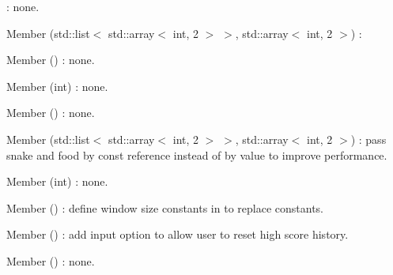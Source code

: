 \begin{DoxyRefList}
%
\+: none.  
\item[Member \doxylink{classbocan_1_1snake_1_1_printer_a250cffd120e0e4ecfd742067be2a8115}{bocan\+::snake\+::Printer\+::Print\+Game\+Space} (std\+::list\texorpdfstring{$<$}{<} std\+::array$<$ int, 2 $>$ \texorpdfstring{$>$}{>}, std\+::array$<$ int, 2 $>$)]\label{todo__todo000027}%
%
\+: 
\item[Member \doxylink{classbocan_1_1snake_1_1_printer_a6b80c58e18895a5b1f3c55299e56ac72}{bocan\+::snake\+::Printer\+::Print\+High\+Score} ()]\label{todo__todo000025}%
%
\+: none.  
\item[Member \doxylink{classbocan_1_1snake_1_1_printer_a91b9cb1da21d44872e1ae7b20b6c4484}{bocan\+::snake\+::Printer\+::Print\+Score} (int)]\label{todo__todo000026}%
%
\+: none.  
\item[Member \doxylink{classbocan_1_1snake_1_1_printer_ab9130e2306e02b310c8467be627cab32}{bocan\+::snake\+::Printer\+::Print\+Title} ()]\label{todo__todo000024}%
%
\+: none.  
\item[Member \doxylink{classbocan_1_1snake_1_1_printer_a5688d3095fa7bb74abfbcd950639a200}{bocan\+::snake\+::Printer\+::Refresh\+Game\+Space} (std\+::list\texorpdfstring{$<$}{<} std\+::array$<$ int, 2 $>$ \texorpdfstring{$>$}{>}, std\+::array$<$ int, 2 $>$)]\label{todo__todo000018}%
%
\+: pass snake and food by const reference instead of by value to improve performance.  
\item[Member \doxylink{classbocan_1_1snake_1_1_printer_a695ce84bafb85394adb69f9f8540aed4}{bocan\+::snake\+::Printer\+::Refresh\+Screen} (int)]\label{todo__todo000017}%
%
\+: none.  
\item[Member \doxylink{classbocan_1_1snake_1_1_printer_ac12cf98597aae1e32b651b7da9c7a7a3}{bocan\+::snake\+::Printer\+::Setup\+Screen} ()]\label{todo__todo000015}%
%
\+: define window size constants in  to replace constants.  
\item[Member \doxylink{classbocan_1_1snake_1_1_printer_a4dec5029da2ca69959a2a44c7801fb70}{bocan\+::snake\+::Printer\+::Start\+Game} ()]\label{todo__todo000019}%
%
\+: add input option to allow user to reset high score history.  
\item[Member \doxylink{classbocan_1_1snake_1_1_printer_a011da1d2aa31df5440071c0b6e80eb1d}{bocan\+::snake\+::Printer\+::\texorpdfstring{$\sim$}{\string~}\+Printer} ()]\label{todo__todo000014}%
%
\+: none. 
\end{DoxyRefList}